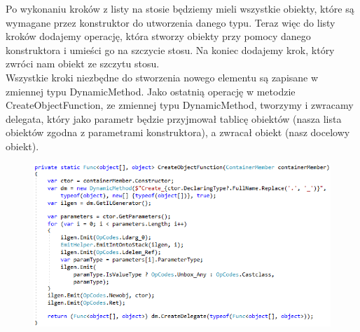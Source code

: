 \documentclass[12pt]{article}
\begin{document}
Po wykonaniu kroków z listy na stosie będziemy mieli wszystkie obiekty, które są wymagane przez konstruktor do utworzenia danego typu. Teraz więc do listy kroków dodajemy operację, która stworzy obiekty przy pomocy danego konstruktora i umieści go na szczycie stosu. Na koniec dodajemy krok, który zwróci nam obiekt ze szczytu stosu.\\
Wszystkie kroki niezbędne do stworzenia nowego elementu są zapisane w zmiennej typu DynamicMethod. Jako ostatnią operację w metodzie CreateObjectFunction, ze zmiennej typu DynamicMethod, tworzymy i zwracamy delegata, który jako parametr będzie przyjmował tablicę obiektów (nasza lista obiektów zgodna z parametrami konstruktora), a zwracał obiekt (nasz docelowy obiekt).
\begin{figure}[h]
	\begin{raggedleft}
  		\includegraphics{PartialEmitFunction_CreateObjectFunction.png}
	\end{raggedleft}
\end{figure}

\clearpage
\end{document}
